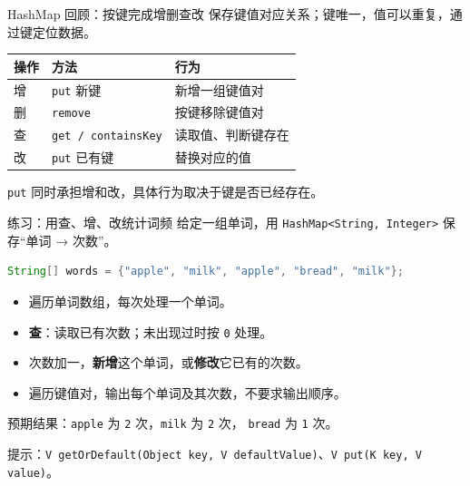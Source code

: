 \documentclass[aspectratio=169]{beamer}
\begin{document}
\begin{frame}{HashMap 回顾：按键完成增删查改}
  保存键值对应关系；键唯一，值可以重复，通过键定位数据。
  \par\bigskip
  \begin{center}
    \renewcommand{\arraystretch}{1.4}
    \begin{tabular}{lll}
      \textbf{操作} & \textbf{方法} & \textbf{行为} \\
      \hline
      增 & \texttt{put} 新键 & 新增一组键值对 \\
      删 & \texttt{remove} & 按键移除键值对 \\
      查 & \texttt{get / containsKey} & 读取值、判断键存在 \\
      改 & \texttt{put} 已有键 & 替换对应的值 \\
    \end{tabular}
  \end{center}
  \bigskip
  \texttt{put} 同时承担\alert{增和改}，具体行为取决于键是否已经存在。
\end{frame}

\begin{frame}[fragile]{练习：用查、增、改统计词频}
  给定一组单词，用 \texttt{HashMap<String, Integer>} 保存“单词 → 次数”。
  \begin{lstlisting}[language=Java]
String[] words = {"apple", "milk", "apple", "bread", "milk"};
  \end{lstlisting}
  \begin{itemize}
    \item 遍历单词数组，每次处理一个单词。
    \item \textbf{查}：读取已有次数；未出现过时按 \texttt{0} 处理。
    \item 次数加一，\textbf{新增}这个单词，或\textbf{修改}它已有的次数。
    \item 遍历键值对，输出每个单词及其次数，不要求输出顺序。
  \end{itemize}
  \medskip
  预期结果：\texttt{apple} 为 \texttt{2} 次，\texttt{milk} 为 \texttt{2} 次，
  \texttt{bread} 为 \texttt{1} 次。
  \par\medskip
  提示：\texttt{V getOrDefault(Object key, V defaultValue)}、\texttt{V put(K key, V value)}。
\end{frame}
\end{document}
